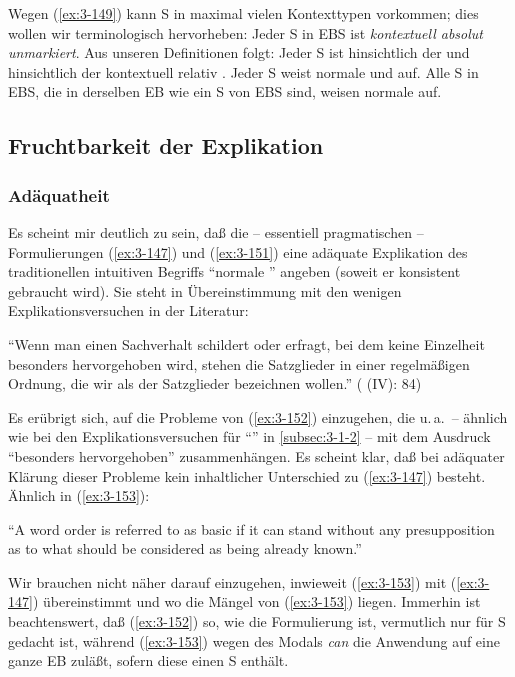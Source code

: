 \documentclass[output=paper]{langsci/langscibook}
\begin{document}
Wegen (\ref{ex:3-149}) kann S in maximal vielen Kontexttypen vorkommen; dies wollen wir terminologisch hervorheben:
\ea
\label{ex:3-150}
Jeder S in EBS ist \textit{kontextuell absolut unmarkiert}.
\z
Aus unseren Definitionen folgt:
\eal
\label{ex:3-151}
\ex
\label{ex:3-151a}
Jeder S ist hinsichtlich der  und hinsichtlich der  kontextuell relativ .
\ex
\label{ex:3-151b}
Jeder S weist normale  und  auf.
\ex
\label{ex:3-151c}
Alle S in EBS, die in derselben EB wie ein S von
EBS sind, weisen normale  auf.
\zl


\subsection{Fruchtbarkeit der Explikation}
\label{subsec:3-2-3}

\subsubsection{Adäquatheit}
\label{subsubsec:3-2-3-1}

Es scheint mir deutlich zu sein, daß die -- essentiell pragmatischen --
Formulierungen (\ref{ex:3-147}) und (\ref{ex:3-151}) eine adäquate Explikation des
traditionellen intuitiven Begriffs "`normale "' angeben
(soweit er konsistent gebraucht wird). Sie steht in Übereinstimmung
mit den wenigen Explikationsversuchen in der Literatur:
\begin{exe}
\ex\label{ex:3-152}
"`Wenn man einen Sachverhalt schildert oder erfragt, bei dem keine
Einzelheit besonders hervorgehoben wird, stehen die Satzglieder in
einer regelmäßigen Ordnung, die wir als 
der Satzglieder bezeichnen wollen."' (\citealt{Griesbach1961a} (IV): 84)
\end{exe}
Es erübrigt sich, auf die Probleme von (\ref{ex:3-152}) einzugehen, die
u.\,a.\ -- ähnlich wie bei den Explikationsversuchen für "`"'
in \ref{subsec:3-1-2} -- mit dem Ausdruck "`besonders hervorgehoben"' zusammenhängen. Es
scheint klar, daß bei adäquater Klärung dieser Probleme kein
inhaltlicher Unterschied zu (\ref{ex:3-147}) besteht. Ähnlich in (\ref{ex:3-153}):
\begin{exe}
\ex\label{ex:3-153}
"`A word order is referred to as basic if it can stand without any
presupposition as to what should be considered as being already known."'
\citep[140]{Kiefer70}
\end{exe}
Wir brauchen nicht näher darauf einzugehen, inwieweit (\ref{ex:3-153}) mit (\ref{ex:3-147})
übereinstimmt und wo die Mängel von (\ref{ex:3-153}) liegen. Immerhin ist
beachtenswert, daß (\ref{ex:3-152}) so, wie die Formulierung ist, vermutlich nur
für S gedacht ist, während (\ref{ex:3-153}) wegen des Modals \textit{can} die
Anwendung auf eine ganze EB zuläßt, sofern diese einen S enthält.
\end{document}
